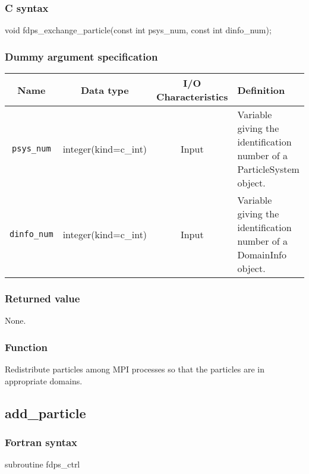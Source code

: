 \subsubsection*{C syntax}
\begin{screen}
\begin{spverbatim}
void fdps_exchange_particle(const int psys_num,
                            const int dinfo_num);
\end{spverbatim}
\end{screen}

\subsubsection*{Dummy argument specification}
\begin{table}[h]
\begin{tabularx}{\linewidth}{cccX}
\toprule
\rowcolor{Snow2}
Name & Data type & I/O Characteristics & Definition \\         
\midrule
\texttt{psys\_num} & integer(kind=c\_int) & Input & Variable giving the identification number of a ParticleSystem object.\\
\texttt{dinfo\_num} & integer(kind=c\_int) & Input & Variable giving the identification number of a DomainInfo object.\\
\bottomrule
\end{tabularx}
\end{table}

\subsubsection*{Returned value}
None.

\subsubsection*{Function}
Redistribute particles among MPI processes so that the particles are
in appropriate domains.

\clearpage

\subsection{add\_particle}
\subsubsection*{Fortran syntax}
\begin{screen}
\begin{spverbatim}
subroutine fdps_ctrl%
\end{spverbatim}
\end{screen}

